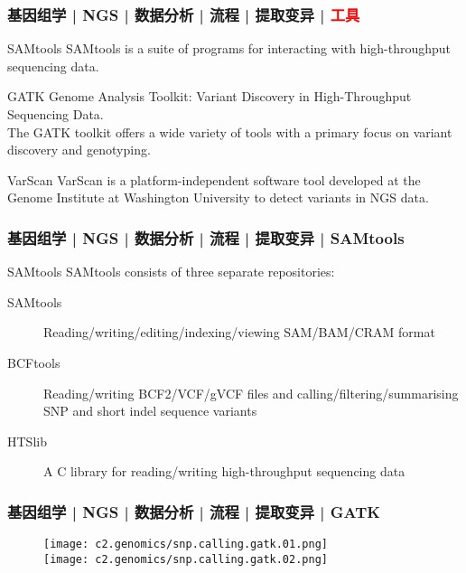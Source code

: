 \begin{frame}
  \frametitle{基因组学 | NGS | 数据分析 | 流程 | 提取变异 | \textcolor{red}{工具}}
  \begin{block}{SAMtools}
    SAMtools is a suite of programs for interacting with high-throughput sequencing data.
  \end{block}
  \pause
  \begin{block}{GATK}
    Genome Analysis Toolkit: Variant Discovery in High-Throughput Sequencing Data.\\
    The GATK toolkit offers a wide variety of tools with a primary focus on variant discovery and genotyping.
  \end{block}
  \pause
  \begin{block}{VarScan}
    VarScan is a platform-independent software tool developed at the Genome Institute at Washington University to detect variants in NGS data.
  \end{block}
\end{frame}

\begin{frame}
  \frametitle{基因组学 | NGS | 数据分析 | 流程 | 提取变异 | SAMtools}
  \begin{block}{SAMtools}
    SAMtools consists of three separate repositories:
    \begin{description}
      \item[SAMtools] Reading/writing/editing/indexing/viewing SAM/BAM/CRAM format
      \item[BCFtools] Reading/writing BCF2/VCF/gVCF files and calling/filtering/summarising SNP and short indel sequence variants
      \item[HTSlib] A C library for reading/writing high-throughput sequencing data
    \end{description}
  \end{block}
\end{frame}

\begin{frame}
  \frametitle{基因组学 | NGS | 数据分析 | 流程 | 提取变异 | GATK}
  \begin{figure}
    \centering
    \texttt{[image: c2.genomics/snp.calling.gatk.01.png]}\\
    \vspace{1em}
    \texttt{[image: c2.genomics/snp.calling.gatk.02.png]}
  \end{figure}
\end{frame}

